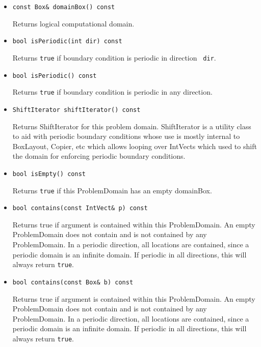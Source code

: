 \begin{itemize}
\item 
\begin{verbatim}
const Box& domainBox() const 
\end{verbatim}
Returns logical computational domain. 

\item
\begin{verbatim}
bool isPeriodic(int dir) const
\end{verbatim}
Returns {\tt true} if boundary condition is periodic in direction {\tt
dir}.


\item
\begin{verbatim}
bool isPeriodic() const
\end{verbatim}
Returns {\tt true} if boundary condition is periodic in any direction.

\item
\begin{verbatim}
ShiftIterator shiftIterator() const
\end{verbatim}
Returns ShiftIterator for this problem domain.  ShiftIterator is a
utility class to aid with periodic boundary conditions whose use is
mostly internal to BoxLayout, Copier, etc which allows looping over
IntVects which used to shift the domain for enforcing periodic
boundary conditions.

\item
\begin{verbatim}
bool isEmpty() const
\end{verbatim}
Returns {\tt true} if this ProblemDomain has an empty domainBox.


\item
\begin{verbatim}
bool contains(const IntVect& p) const
\end{verbatim}
Returns true if argument is contained within this ProblemDomain.  An
empty ProblemDomain does not contain and is not contained by any
ProblemDomain.  In a periodic direction, all locations are contained,
since a periodic domain is an infinite domain. If periodic in all
directions, this will always return {\tt true}.


\item
\begin{verbatim}
bool contains(const Box& b) const
\end{verbatim}
Returns true if argument is contained within this ProblemDomain.  An
empty ProblemDomain does not contain and is not contained by any
ProblemDomain.  In a periodic direction, all locations are contained,
since a periodic domain is an infinite domain. If periodic in all
directions, this will always return {\tt true}.



\end{itemize}
